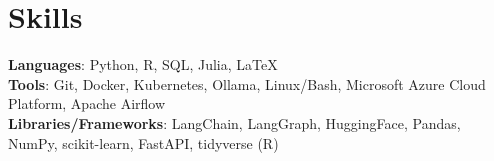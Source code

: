 \documentclass[letterpaper,11pt]{article}
\makeatletter
\newcommand{\resumeItem}[1]{
  \item\small{
    {#1 \vspace{-2pt}}
  }
}
\newcommand{\resumeSubheading}[4]{
  \vspace{-2pt}\item
    \begin{tabular*}{1.0\textwidth}[t]{l@{\extracolsep{\fill}}r}
      \textbf{#1} & \small #2 \\
      \textit{\small#3} & \textit{\small #4} \\
    \end{tabular*}\vspace{-7pt}
}
\newcommand{\resumeSubHeadingListStart}{\begin{itemize}[leftmargin=0.0in, label={}]}
\newcommand{\resumeSubHeadingListEnd}{\end{itemize}}
\newcommand{\resumeItemListStart}{\begin{itemize}}
\newcommand{\resumeItemListEnd}{\end{itemize}\vspace{-5pt}}
\makeatother
\begin{document}
\section{Skills}
  \begin{itemize}[leftmargin=0.15in, label={}]
      \small{\item{
      \textbf{Languages}{: Python, R, SQL, Julia, \LaTeX} \\
      \textbf{Tools}{: Git, Docker, Kubernetes, Ollama, Linux/Bash, Microsoft Azure Cloud Platform, Apache Airflow} \\
      \textbf{Libraries/Frameworks}{: LangChain, LangGraph, HuggingFace, Pandas, NumPy, scikit-learn, FastAPI, tidyverse (R)}  \\
      }}
  \end{itemize} 

\end{document}
